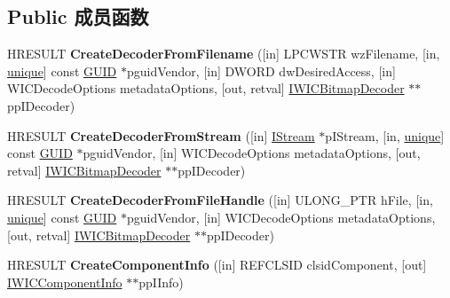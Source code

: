 \subsection*{Public 成员函数}
\begin{DoxyCompactItemize}
\item 
\mbox{\label{interface_i_w_i_c_imaging_factory_a6d2d9d52d4f2680860e72becc01d6112}} 
H\+R\+E\+S\+U\+LT {\bfseries Create\+Decoder\+From\+Filename} (\mbox{[}in\mbox{]} L\+P\+C\+W\+S\+TR wz\+Filename, \mbox{[}in, \hyperlink{interfaceunique}{unique}\mbox{]} const \hyperlink{interface_g_u_i_d}{G\+U\+ID} $\ast$pguid\+Vendor, \mbox{[}in\mbox{]} D\+W\+O\+RD dw\+Desired\+Access, \mbox{[}in\mbox{]} W\+I\+C\+Decode\+Options metadata\+Options, \mbox{[}out, retval\mbox{]} \hyperlink{interface_i_w_i_c_bitmap_decoder}{I\+W\+I\+C\+Bitmap\+Decoder} $\ast$$\ast$pp\+I\+Decoder)
\item 
\mbox{\label{interface_i_w_i_c_imaging_factory_a6937c11243a6a8b0cf513b7e8cb9dc2c}} 
H\+R\+E\+S\+U\+LT {\bfseries Create\+Decoder\+From\+Stream} (\mbox{[}in\mbox{]} \hyperlink{interface_i_stream}{I\+Stream} $\ast$p\+I\+Stream, \mbox{[}in, \hyperlink{interfaceunique}{unique}\mbox{]} const \hyperlink{interface_g_u_i_d}{G\+U\+ID} $\ast$pguid\+Vendor, \mbox{[}in\mbox{]} W\+I\+C\+Decode\+Options metadata\+Options, \mbox{[}out, retval\mbox{]} \hyperlink{interface_i_w_i_c_bitmap_decoder}{I\+W\+I\+C\+Bitmap\+Decoder} $\ast$$\ast$pp\+I\+Decoder)
\item 
\mbox{\label{interface_i_w_i_c_imaging_factory_aea65c856f155954b6882d1aacc68fe38}} 
H\+R\+E\+S\+U\+LT {\bfseries Create\+Decoder\+From\+File\+Handle} (\mbox{[}in\mbox{]} U\+L\+O\+N\+G\+\_\+\+P\+TR h\+File, \mbox{[}in, \hyperlink{interfaceunique}{unique}\mbox{]} const \hyperlink{interface_g_u_i_d}{G\+U\+ID} $\ast$pguid\+Vendor, \mbox{[}in\mbox{]} W\+I\+C\+Decode\+Options metadata\+Options, \mbox{[}out, retval\mbox{]} \hyperlink{interface_i_w_i_c_bitmap_decoder}{I\+W\+I\+C\+Bitmap\+Decoder} $\ast$$\ast$pp\+I\+Decoder)
\item 
\mbox{\label{interface_i_w_i_c_imaging_factory_ad5a0b24ab0bec638ecab8d6aa2f21f3c}} 
H\+R\+E\+S\+U\+LT {\bfseries Create\+Component\+Info} (\mbox{[}in\mbox{]} R\+E\+F\+C\+L\+S\+ID clsid\+Component, \mbox{[}out\mbox{]} \hyperlink{interface_i_w_i_c_component_info}{I\+W\+I\+C\+Component\+Info} $\ast$$\ast$pp\+I\+Info)

\end{DoxyCompactItemize}
